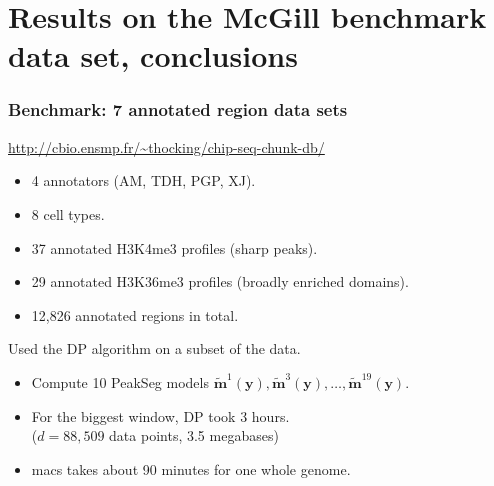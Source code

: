 \documentclass{beamer}
\begin{document}
\section{Results on the McGill benchmark data set, conclusions}

\begin{frame}
  \frametitle{Benchmark: 7 annotated region data sets}
  \url{http://cbio.ensmp.fr/~thocking/chip-seq-chunk-db/}
  \begin{itemize}
  \item 4 annotators (AM, TDH, PGP, XJ).
  \item 8 cell types.
  \item 37 annotated H3K4me3 profiles (sharp peaks).
  \item 29 annotated H3K36me3 profiles (broadly enriched domains).
  \item 12,826 annotated regions in total.
  \end{itemize}
  Used the DP algorithm on a subset of the data.
  \begin{itemize}
  \item Compute 10 PeakSeg models $\mathbf{\tilde m}^1(\mathbf
    y),\mathbf{\tilde m}^3(\mathbf y), \dots, \mathbf{\tilde
      m}^{19}(\mathbf y)$.
  \item For the biggest window, DP took 3 hours.\\
    ($d=88,509$ data points, 3.5  megabases)
  \item macs takes about 90 minutes for one whole genome.
  \end{itemize}
\end{frame}
\end{document}
